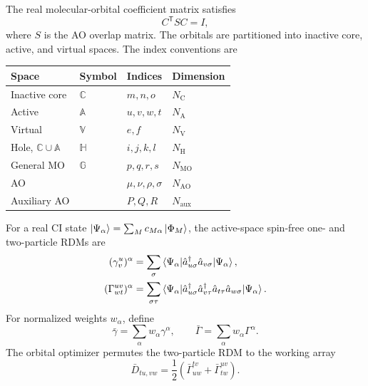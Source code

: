 \documentclass[aip,preprint,nofootinbib]{revtex4-1}
\begin{document}
The real molecular-orbital coefficient matrix satisfies
\begin{equation}
 C^{\mathsf T} S C=I,
\end{equation}
where $S$ is the AO overlap matrix.  The orbitals are partitioned into
inactive core, active, and virtual spaces.  The index conventions are
\begin{center}
\begin{tabular}{llll}
\hline\hline
Space & Symbol & Indices & Dimension \\
\hline
Inactive core & $\mathbb C$ & $m,n,o$ & $N_{\mathrm C}$ \\
Active & $\mathbb A$ & $u,v,w,t$ & $N_{\mathrm A}$ \\
Virtual & $\mathbb V$ & $e,f$ & $N_{\mathrm V}$ \\
Hole, $\mathbb C\cup\mathbb A$ & $\mathbb H$ & $i,j,k,l$ & $N_{\mathrm H}$ \\
General MO & $\mathbb G$ & $p,q,r,s$ & $N_{\mathrm{MO}}$ \\
AO & & $\mu,\nu,\rho,\sigma$ & $N_{\mathrm{AO}}$ \\
Auxiliary AO & & $P,Q,R$ & $N_{\mathrm{aux}}$ \\
\hline\hline
\end{tabular}
\end{center}

For a real CI state $\ket{\Psi_\alpha}=\sum_M c_{M\alpha}\ket{\Phi_M}$,
the active-space spin-free one- and two-particle RDMs are
\begin{align}
 (\gamma^u_v)^\alpha
 &=\sum_\sigma\braket{\Psi_\alpha|
   \hat a^\dagger_{u\sigma}\hat a_{v\sigma}|\Psi_\alpha},
 \\
 (\Gamma^{uv}_{wt})^\alpha
 &=\sum_{\sigma\tau}\braket{\Psi_\alpha|
   \hat a^\dagger_{u\sigma}\hat a^\dagger_{v\tau}
   \hat a_{t\tau}\hat a_{w\sigma}|\Psi_\alpha}.
\end{align}
For normalized weights $w_\alpha$, define
\begin{equation}
 \bar\gamma=\sum_\alpha w_\alpha\gamma^\alpha,
 \qquad
 \bar\Gamma=\sum_\alpha w_\alpha\Gamma^\alpha.
 \label{eq:nr-average-rdms}
\end{equation}
The orbital optimizer permutes the two-particle RDM to the working array
\begin{equation}
 \bar D_{tu,vw}
 =\frac{1}{2}\left(\bar\Gamma^{tv}_{uw}+\bar\Gamma^{uv}_{tw}\right).
 \label{eq:nr-working-rdm}
\end{equation}
\end{document}
